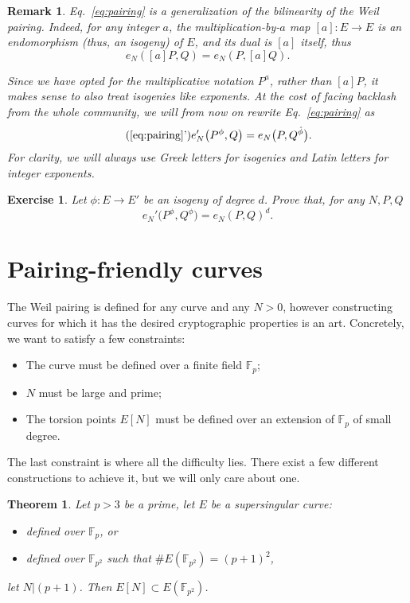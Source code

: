 \documentclass{article}
\newtheorem{ex}{Exercise}
\newtheorem{thm}[defi]{Theorem}
\newtheorem{rk}[defi]{Remark}
\def\F{\mathbb{F}}
\begin{document}
\begin{rk}
  Eq.~\eqref{eq:pairing} is a generalization of the bilinearity of the
  Weil pairing.  Indeed, for any integer $a$, the
  multiplication-by-$a$ map $[a]:E\to E$ is an endomorphism (thus, an
  isogeny) of $E$, and its dual is $[a]$ itself, thus
  \[e_N([a]P, Q) = e_N(P, [a]Q).\]

  Since we have opted for the multiplicative notation $P^a$, rather
  than $[a]P$, it makes sense to also treat isogenies like exponents.
  At the cost of facing backlash from the whole community, we will
  from now on rewrite Eq.~\eqref{eq:pairing} as
  \begin{equation}
    \tag{\ref*{eq:pairing}'}
    \label{eq:pairing-exp}
    e_N'\bigl(P^\phi, Q\bigr) = e_N\bigl(P, Q^{\hat\phi}\bigr).
  \end{equation}
  For clarity, we will always use Greek letters for isogenies and
  Latin letters for integer exponents.
\end{rk}

\begin{ex}
  Let $\phi:E\to E'$ be an isogeny of degree $d$. Prove that, for any
  $N,P,Q$
  \[e_N'\bigl(P^\phi,Q^\phi\bigr) = e_N(P,Q)^d.\]
\end{ex}


\section{Pairing-friendly curves}

The Weil pairing is defined for any curve and any $N>0$, however
constructing curves for which it has the desired cryptographic
properties is an art.  Concretely, we want to satisfy a few
constraints:
%
\begin{itemize}
\item The curve must be defined over a finite field $\F_p$;
\item $N$ must be large and prime;
\item The torsion points $E[N]$ must be defined over an extension of
  $\F_p$ of small degree.
\end{itemize}
%
The last constraint is where all the difficulty lies.  There exist a
few different constructions to achieve it, but we will only care about
one.

\begin{thm}
  Let $p>3$ be a prime, let $E$ be a supersingular curve:
  \begin{itemize}
  \item defined over $\F_p$, or
  \item defined over $\F_{p^2}$ such that $\#E(\F_{p^2}) = (p+1)^2$, 
  \end{itemize}
  let $N|(p+1)$.  Then $E[N]\subset E(\F_{p^2})$.
\end{thm}
\end{document}
